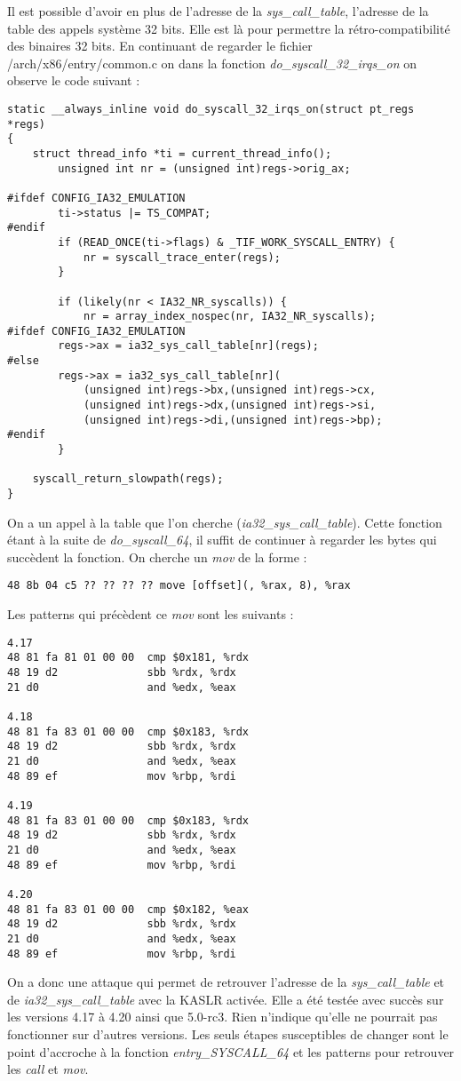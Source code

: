 \documentclass[journal, a4paper]{IEEEtran}
\begin{document}
Il est possible d'avoir en plus de l'adresse de la \textit{sys\_call\_table}, l'adresse de la table des appels système 32 bits. Elle est là pour permettre la rétro-compatibilité des binaires 32 bits. En continuant de regarder le fichier /arch/x86/entry/common.c on dans la fonction \textit{do\_syscall\_32\_irqs\_on} on observe le code suivant :
\begin{lstlisting}[style=CStyle]
static __always_inline void do_syscall_32_irqs_on(struct pt_regs *regs)
{
	struct thread_info *ti = current_thread_info();
		unsigned int nr = (unsigned int)regs->orig_ax;

#ifdef CONFIG_IA32_EMULATION
		ti->status |= TS_COMPAT;
#endif
		if (READ_ONCE(ti->flags) & _TIF_WORK_SYSCALL_ENTRY) {
			nr = syscall_trace_enter(regs);
		}

		if (likely(nr < IA32_NR_syscalls)) {
			nr = array_index_nospec(nr, IA32_NR_syscalls);
#ifdef CONFIG_IA32_EMULATION
		regs->ax = ia32_sys_call_table[nr](regs);
#else
		regs->ax = ia32_sys_call_table[nr](
			(unsigned int)regs->bx,(unsigned int)regs->cx,
			(unsigned int)regs->dx,(unsigned int)regs->si,
			(unsigned int)regs->di,(unsigned int)regs->bp);
#endif
		}

	syscall_return_slowpath(regs);
}
\end{lstlisting}
On a un appel à la table que l'on cherche (\textit{ia32\_sys\_call\_table}).
Cette fonction étant à la suite de \textit{do\_syscall\_64}, il suffit de continuer à regarder les bytes qui succèdent la fonction. On cherche un \textit{mov} de la forme :
\begin{lstlisting}[style=CStyle]
48 8b 04 c5 ?? ?? ?? ?? move [offset](, %rax, 8), %rax
\end{lstlisting}
Les patterns qui précèdent ce \textit{mov} sont les suivants :
\begin{lstlisting}[style=CStyle]
4.17  
48 81 fa 81 01 00 00  cmp $0x181, %rdx  
48 19 d2              sbb %rdx, %rdx  
21 d0                 and %edx, %eax  

4.18  
48 81 fa 83 01 00 00  cmp $0x183, %rdx  
48 19 d2              sbb %rdx, %rdx  
21 d0                 and %edx, %eax  
48 89 ef              mov %rbp, %rdi  

4.19  
48 81 fa 83 01 00 00  cmp $0x183, %rdx  
48 19 d2              sbb %rdx, %rdx  
21 d0                 and %edx, %eax  
48 89 ef              mov %rbp, %rdi  

4.20  
48 81 fa 83 01 00 00  cmp $0x182, %eax  
48 19 d2              sbb %rdx, %rdx  
21 d0                 and %edx, %eax  
48 89 ef              mov %rbp, %rdi  
\end{lstlisting}
On a donc une attaque qui permet de retrouver l'adresse de la \textit{sys\_call\_table} et de \textit{ia32\_sys\_call\_table} avec la KASLR activée. Elle a été testée avec succès sur les versions 4.17 à 4.20 ainsi que 5.0-rc3. Rien n'indique qu'elle ne pourrait pas fonctionner sur d'autres versions. Les seuls étapes susceptibles de changer sont le point d'accroche à la fonction \textit{entry\_SYSCALL\_64} et les patterns pour retrouver les \textit{call} et \textit{mov}.
\end{document}
